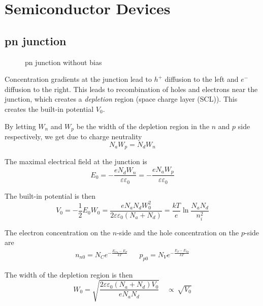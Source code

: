 \section{Semiconductor Devices}

\subsection{pn junction}
\begin{figure}[ht!]
    \centering
    
    \caption{pn junction without bias}
\end{figure}

Concentration gradients at the junction lead to $h^+$ diffusion to the left
and $e^-$ diffusion to the right. 
This leads to recombination of holes and electrons near the junction, which
creates a \emph{depletion} region (space charge layer (SCL)).
This creates the built-in potential $V_0$. 

By letting $W_n$ and $W_p$ be the width of the depletion region in the $n$ and $p$
side respectively, we get due to charge neutrality
\begin{equation}
    N_a W_p = N_d W_n
\end{equation}


The maximal electrical field at the junction is
\begin{equation}
    E_0 = -\frac{e N_d W_n}{\varepsilon\varepsilon_0} = - \frac{e N_a W_p}{\varepsilon\varepsilon_0}
\end{equation}

The built-in potential is then
\begin{equation}
    V_0 = -\frac{1}{2} E_0 W_0 = \frac{e N_a N_d W_0^2}{2 \varepsilon\varepsilon_0 (N_a + N_d)} = \frac{kT}{e} \ln\frac{N_a N_d}{n_i^2}
\end{equation}

The electron concentration on the $n$-side and the hole concentration on the $p$-side are 
\begin{align}
    n_{n0} = N_C e^{-\frac{E_{Cn}-E_F}{kT}} && p_{p0} = N_V e^{-\frac{E_F-E_{Vp}}{kT}}
\end{align}

The width of the depletion region is then
\begin{equation}
    W_0 = \sqrt{\frac{2\varepsilon\varepsilon_0\left(N_a+N_d\right)V_0}{eN_aN_d}}
    \quad \propto\,\sqrt{V_0}
\end{equation}

